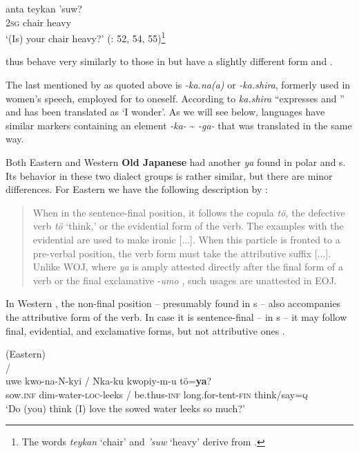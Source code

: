     \ex
    \gll anta teykan ’suw?\\
    2\textsc{sg}  chair    heavy\\
    \glt ‘(Is) your chair heavy?’ (\citealt{Peng2015}: 52, 54, 55)\footnote{The words \textit{teykan} ‘chair’ and \textit{’suw} ‘heavy’ derive from .}\z\z

\noindent {}  thus behave very similarly to those in  but have a slightly different form and .

The last  mentioned by \citet[295]{TranterKizu2012} as quoted above is \textit{-ka.na(a)} or \textit{-ka.shira}, formerly used in women’s speech, employed for  to oneself. According to \citet[294]{Hasegawa2015} \textit{ka.shira} “expresses  and ” and has been translated as ‘I wonder’. As we will see below,  languages have similar markers containing an element \textit{-ka-} {\textasciitilde} \textit{-ga-} that was translated in the same way.

Both Eastern and Western \textbf{Old Japanese} had another  \textit{ya} found in polar and s. Its behavior in these two dialect groups is rather similar, but there are minor differences. For Eastern  we have the following description by \citet[832]{Kupchik2011}:

\begin{quote}
When in the sentence-final position, it follows the copula \textit{tö,} the defective verb \textit{tö} ‘think,’ or the evidential form of the verb. The examples with the evidential are used to make ironic  [...]. When this particle is fronted to a pre-verbal position, the verb form must take the attributive suffix [...]. Unlike WOJ, where \textit{ya} is amply attested directly after the final form of a verb or the final exclamative -\textit{umo} \citep[1211]{Vovin2009}, such usages are unattested in EOJ.
\end{quote}

In Western ,  the non-final position -- presumably found in s -- also accompanies the attributive form of the verb. In case it is sentence-final -- in s -- it may follow final, evidential, and exclamative forms, but not attributive ones \citep[1211]{Vovin2009}.

\ea%
    \label{ex:japa:10}
     (Eastern)\\
    \ea
    /\\
    \gll uwe kwo-na-N-kyi / Nka-ku kwopiy-m-u tö=\textbf{{ya}}?\\
    sow.\textsc{inf}  dim-water-\textsc{loc}-leeks  /  be.thus-\textsc{inf} long.for-tent-\textsc{fin}  think/say=\textsc{q}\\
    \glt ‘Do (you) think (I) love the sowed water leeks so much?’
    
